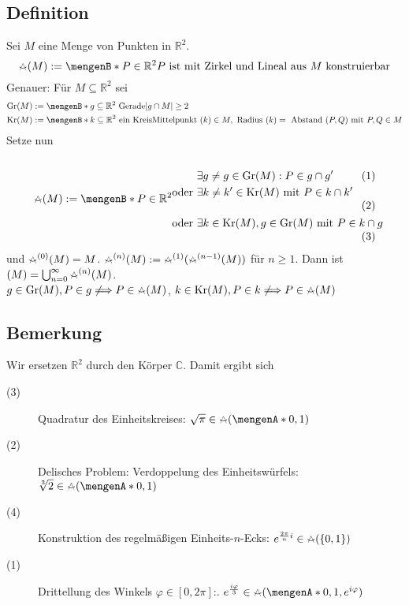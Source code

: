 \subsection[Definition: Aus $M \subset \mathds{R}^2$ konstruierbar]{Definition} %
\label{sub:103}
Sei $M$ eine Menge von Punkten in $\mathds{R}^2$. 
\[
	\zirkel(M) := \set[P \in \mathds{R}^2]{ P \text{ ist mit Zirkel und Lineal aus } M \text{ konstruierbar}} 
\]
Genauer: Für $M \subseteq \mathds{R}^2$ sei   
\begin{align*}
	\Gr(M) &:= \set[g \subseteq \mathds{R}^2 \text{ Gerade}]{\abs{g \cap M}\ge 2 } \\
	\Kr(M) &:= \set[k \subseteq \mathds{R}^2 \text{ ein Kreis}]{\text{Mittelpunkt }(k) \in M , \text{ Radius }(k) = \text{ Abstand }(P,Q) \text{ mit } P,Q \in M} 
\end{align*}
Setze nun
\[
	\zirkel (M) := \set[P \in \mathds{R}^2]{
	\vcenter{\hbox{\begin{minipage}[b]{6.5cm}
		\begin{align*}
			&\exists g \not= g \in \Gr(M) : P \in g \cap g' \\
					\text{oder } &\exists k \not= k' \in \Kr(M) \text{ mit } P \in k \cap k' \\
					\text{oder } &\exists k \in \Kr(M), g \in \Gr(M) \text{ mit } P \in k \cap g
		\end{align*}
	\end{minipage}}}} 
\]
und $\zirkel^{(0)}(M) = M$. $\zirkel^{(n)}(M) := \zirkel^{(1)} \enbrace{\zirkel^{(n-1)}(M)} $ für $n \ge 1$. Dann ist $(M) = \bigcup_{n=0}^\infty \zirkel^{(n)}(M)	$. \\
 $g \in \Gr(M), P \in g \not\Longrightarrow P \in \zirkel(M)$, $k \in \Kr(M), P \in k \not\Longrightarrow P \in \zirkel(M)$

\subsection[Bemerkung: Übersetzung der Konstruktionsprobleme in Zahlen aus $\mathds{C}$]{Bemerkung} %
\label{sub:104}
Wir ersetzen $\mathds{R}^2$ durch den Körper $\mathds{C}$. Damit ergibt sich 
\begin{description}
	\item[(3)] Quadratur des Einheitskreises: $\sqrt{\pi }  \in \zirkel(\set{0,1})$
	\item[(2)]\label{delisches} Delisches Problem: Verdoppelung des Einheitswürfels: $\sqrt[3]{2} \in \zirkel (\set{0,1}) $
	\item[(4)] Konstruktion des regelmäßigen Einheits-$n$-Ecks: $e^{\frac{2 \pi }{n} i} \in \zirkel(\{0,1\})$ 
	\item[(1)] Drittellung des Winkels $\varphi \in [0, 2\pi ]$:. $e^{\frac{i \varphi}{3} } \in \zirkel(\set{0,1, e^{i \varphi}} )$
\end{description}


